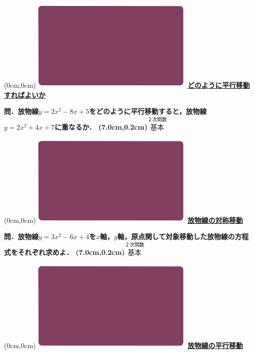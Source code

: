 \documentclass[10pt,
fleqn,
dvipdfmx,
uplatex
]{jsarticle}
\begin{document}
\at(0cm,0cm){\includegraphics[width=8cm,bb=0 0 1920 1080]{./youtube/thumbnails/templates/smart_background/２次関数.jpeg}}
{\color{orange}\bf\boldmath\large\underline{どのように平行移動すればよいか}}\vspace{0.3zw}

\LARGE 
\bf\boldmath 問．放物線$y=2x^2-8x+5$をどのように平行移動すると，放物線$y=2x^2+4x+7$に重なるか．
\at(7.0cm,0.2cm){\small\color{bradorange}$\overset{\text{２次関数}}{\text{基本}}$}


\newpage



\at(0cm,0cm){\includegraphics[width=8cm,bb=0 0 1920 1080]{./youtube/thumbnails/templates/smart_background/２次関数.jpeg}}
{\color{orange}\bf\boldmath\huge\underline{放物線の対称移動}}\vspace{0.3zw}

\Large 
\bf\boldmath 問．放物線$y=3x^2-6x+4$を$x$軸，$y$軸，原点関して対象移動した放物線の方程式をそれぞれ求めよ．
\at(7.0cm,0.2cm){\small\color{bradorange}$\overset{\text{２次関数}}{\text{基本}}$}


\newpage



\at(0cm,0cm){\includegraphics[width=8cm,bb=0 0 1920 1080]{./youtube/thumbnails/templates/smart_background/２次関数.jpeg}}
{\color{orange}\bf\boldmath\huge\underline{放物線の平行移動}}\vspace{0.3zw}
\end{document}
